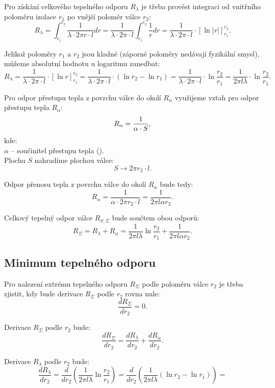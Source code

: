 \documentclass{article}
\begin{document}
Pro získání celkového tepelného odporu $R_\lambda$ je třeba provést integraci od vnitřního poloměru izolace $r_1$ po vnější poloměr válce $r_2$:
$$
    R_\lambda = \int_{r_1}^{r_2} \frac{1}{\lambda \cdot 2 \pi r \cdot l} dr = \frac{1}{\lambda \cdot 2 \pi \cdot l} \int_{r_1}^{r_2} \frac{1}{r} dr = \frac{1}{\lambda \cdot 2 \pi \cdot l} \cdot \left[ \ln |r| \right]_{r_1}^{r_2}.
$$

Jelikož poloměry $r_1$ a $r_2$ jsou kladné (záporné poloměry nedávají fyzikální smysl), můžeme absolutní hodnotu u logaritmu zanedbat:
$$
    R_\lambda = \frac{1}{\lambda \cdot 2 \pi \cdot l} \cdot \left[ \ln r \right]_{r_1}^{r_2} = \frac{1}{\lambda \cdot 2 \pi \cdot l} \cdot \left( \ln r_2 - \ln r_1 \right) = \frac{1}{\lambda \cdot 2 \pi \cdot l} \cdot \ln \frac{r_2}{r_1} = \frac{1}{2 \pi l \lambda} \cdot \ln \frac{r_2}{r_1}.
$$

Pro odpor přestupu tepla z povrchu válce do okolí $R_\alpha$ využijeme vztah pro odpor přestupu tepla $R_\alpha$:
\begin{equation}
    R_\alpha = \frac{1}{\alpha \cdot S},
    \unit{(\ueqKandWinv)}
\end{equation}
kde:\\
$\alpha$ -- součinitel přestupu tepla (\ueqWandMinvsqKinv).\\

Plochu $S$ nahradíme plochou válce:
$$
    S \rightarrow 2 \pi r_2 \cdot l.
$$

Odpor přenosu tepla z povrchu válce do okolí $R_\alpha$ bude tedy:
$$
    R_\alpha = \frac{1}{\alpha \cdot 2 \pi r_2 \cdot l} = \frac{1}{2 \pi l \alpha r_2}.
$$

Celkový tepelný odpor válce $R_{\vartheta, \Sigma}$ bude součtem obou odporů:
$$
    R_\Sigma = R_\lambda + R_\alpha = \frac{1}{2 \pi l \lambda} \ln \frac{r_2}{r_1} + \frac{1}{2 \pi l \alpha r_2}.
$$



\subsection{Minimum tepelného odporu}
Pro nalezení extrému tepelného odporu $R_\Sigma$ podle poloměru válce $r_2$ je třeba zjistit, kdy bude derivace $R_\Sigma$ podle $r_2$ rovna nule:
$$
    \frac{dR_\Sigma}{dr_2} = 0.
$$

Derivace $R_\Sigma$ podle $r_2$ bude:
$$
    \frac{dR_\Sigma}{dr_2} = \frac{dR_\lambda}{dr_2} + \frac{dR_\alpha}{dr_2}.
$$

Derivace $R_\lambda$ podle $r_2$ bude:
$$
    \frac{dR_\lambda}{dr_2} = \frac{d}{dr_2} \left( \frac{1}{2 \pi l \lambda} \ln \frac{r_2}{r_1} \right) = \frac{d}{dr_2} \left( \frac{1}{2 \pi l \lambda} \left(\ln r_2 - \ln r_1 \right) \right) =
$$
\end{document}
